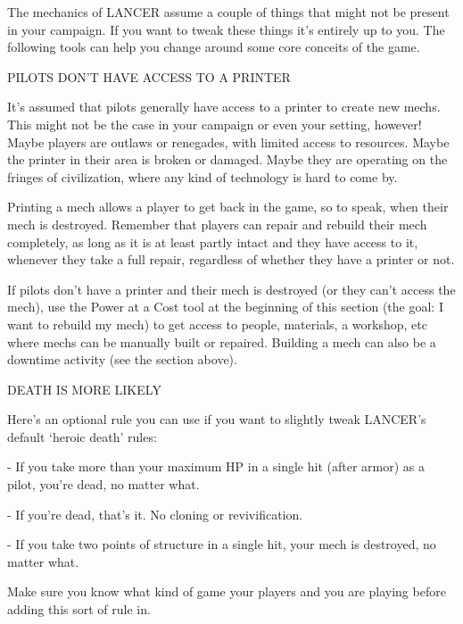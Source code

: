 The mechanics of LANCER assume a couple of things that might not be present in your  
campaign. If you want to tweak these things it’s entirely up to you. The following tools can help  
you change around some core conceits of the game.
 

                           PILOTS DON’T HAVE ACCESS TO A PRINTER
 

It’s assumed that pilots generally have access to a printer to create new mechs. This might not  
be the case in your campaign or even your setting, however! Maybe players are outlaws or  
renegades, with limited access to resources. Maybe the printer in their area is broken or  
damaged. Maybe they are operating on the fringes of civilization, where any kind of technology is  
hard to come by.
 

                                                                                                          


Printing a mech allows a player to get back in the game, so to speak, when their mech is  
destroyed. Remember that players can repair and rebuild their mech completely, as long as it is  
at least partly intact and they have access to it, whenever they take a full repair, regardless of  
whether they have a printer or not. 
 

If pilots don’t have a printer and their mech is destroyed (or they can’t access the mech), use the  
Power at a Cost tool at the beginning of this section (the goal: I want to rebuild my mech) to get  
access to people, materials, a workshop, etc where mechs can be manually built or repaired.  
Building a mech can also be a downtime activity (see the section above).
 

                                          DEATH IS MORE LIKELY
 

Here’s an optional rule you can use if you want to slightly tweak LANCER’s default ‘heroic death’  
rules: 
 
             -    If you take more than your maximum HP in a single hit (after armor) as a pilot,  
                 you’re dead, no matter what. 
 
             -    If you’re dead, that’s it. No cloning or revivification.
 
             -    If you take two points of structure in a single hit, your mech is destroyed, no  
                  matter what. 
 
Make sure you know what kind of game your players and you are playing before adding this sort  
of rule in.
 

